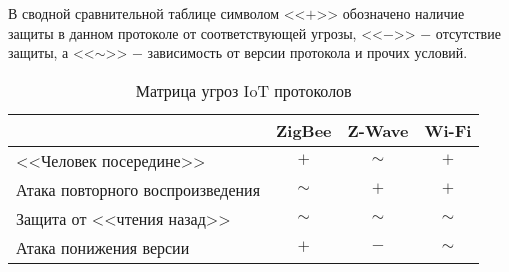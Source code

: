	В сводной сравнительной таблице символом <<$+$>> обозначено наличие защиты в данном протоколе
	от соответствующей угрозы, <<$-$>> $-$ отсутствие защиты, а <<$\sim$>> $-$ зависимость от версии
	протокола и прочих условий.
	
	\begin{table}[h]
		\centering
		\begin{tabular}{ | l | l | l | l | }
			\hline
			& ZigBee & Z-Wave & Wi-Fi \\ \hline
			<<Человек посередине>> & \multicolumn{1}{c|}{$+$} & \multicolumn{1}{c|}{$\sim$} & \multicolumn{1}{c|}{$+$} \\ \hline
			Атака повторного воспроизведения & \multicolumn{1}{c|}{$\sim$} &\multicolumn{1}{c|}{$+$} & \multicolumn{1}{c|}{$+$} \\ \hline
			Защита от <<чтения назад>> & \multicolumn{1}{c|}{$\sim$} & \multicolumn{1}{c|}{$\sim$} & \multicolumn{1}{c|}{$\sim$} \\ \hline
			Атака понижения версии & \multicolumn{1}{c|}{$+$} & \multicolumn{1}{c|}{$-$} & \multicolumn{1}{c|}{$\sim$} \\
			\hline
		\end{tabular}
		\caption{Матрица угроз IoT протоколов}
		\label{table-threat-matrix}
	\end{table}
	